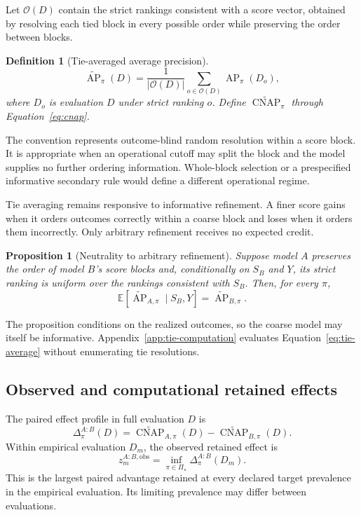 \documentclass[11pt]{article}
\newcommand{\AP}{\operatorname{AP}}
\newcommand{\CNAP}{\operatorname{CNAP}}
\newcommand{\PSet}{\Pi_\star}
\newcommand{\E}{\mathbb{E}}
\newcommand{\APta}{\widetilde{\AP}}
\newcommand{\CNAPta}{\widetilde{\CNAP}}
\newtheorem{definition}{Definition}
\newtheorem{proposition}{Proposition}
\theoremstyle{remark}
\begin{document}
Let $\mathcal O(D)$ contain the strict rankings consistent with a score vector,
obtained by resolving each tied block in every possible order while preserving
the order between blocks.

\begin{definition}[Tie-averaged average precision]
\begin{equation}
\APta_\pi(D)
=
\frac{1}{|\mathcal O(D)|}
\sum_{o\in\mathcal O(D)}\AP_\pi(D_o),
\label{eq:tie-average}
\end{equation}
where $D_o$ is evaluation $D$ under strict ranking $o$. Define
$\CNAPta_\pi$ through Equation~\eqref{eq:cnap}.
\end{definition}

The convention represents outcome-blind random resolution within a score
block. It is appropriate when an operational cutoff may split the block and
the model supplies no further ordering information. Whole-block selection or
a prespecified informative secondary rule would define a different operational
regime.

Tie averaging remains responsive to informative refinement. A finer score
gains when it orders outcomes correctly within a coarse block and loses when it
orders them incorrectly. Only arbitrary refinement receives no expected
credit.

\begin{proposition}[Neutrality to arbitrary refinement]
\label{prop:refinement}
Suppose model $A$ preserves the order of model $B$'s score blocks and,
conditionally on $S_B$ and $Y$, its strict ranking is uniform over the rankings
consistent with $S_B$. Then, for every $\pi$,
\[
\E[\APta_{A,\pi}\mid S_B,Y]=\APta_{B,\pi}.
\]
\end{proposition}

The proposition conditions on the realized outcomes, so the coarse model may
itself be informative. Appendix~\ref{app:tie-computation} evaluates
Equation~\eqref{eq:tie-average} without enumerating tie resolutions.

\subsection{Observed and computational retained effects}

The paired effect profile in full evaluation $D$ is
\begin{equation}
\Delta^{A:B}_\pi(D)
=
\CNAPta_{A,\pi}(D)-\CNAPta_{B,\pi}(D).
\label{eq:paired-profile}
\end{equation}
Within empirical evaluation $D_m$, the observed retained effect is
\begin{equation}
z_m^{A:B,\mathrm{obs}}
=
\inf_{\pi\in\PSet}\Delta^{A:B}_\pi(D_m).
\label{eq:observed-retained}
\end{equation}
This is the largest paired advantage retained at every declared target
prevalence in the empirical evaluation. Its limiting prevalence may differ
between evaluations.
\end{document}
